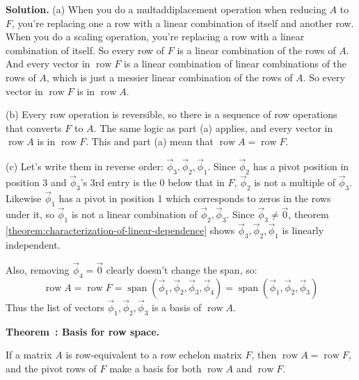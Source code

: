 \documentclass[11pt, letterpaper]{report}
\newenvironment{notes}{}{}
\newenvironment{book}{}{}
\newcounter{theorem}[chapter]
\newenvironment{theorem}[1][]{\refstepcounter{theorem}\begin{bbox}\par
    \noindent\textbf{Theorem~\thetheorem: #1}}{\end{bbox}}
\newlength\oldfboxsep%
\newlength\myminiwidth%
\newenvironment{bbox}{%
  \setlength\oldfboxsep\fboxsep
  \setlength{\fboxsep}{.1in}%
  \setlength\myminiwidth\linewidth%
  \addtolength\myminiwidth{-0.2in}%
  \vspace{0.1in}%
  \begin{lrbox}{\bboxbox}\begin{minipage}{\myminiwidth}%
    }{%
    \end{minipage}\end{lrbox}%
  \noindent\fbox{\usebox{\bboxbox}}\vspace{0.1in}\setlength\fboxsep\oldfboxsep%
}
\DeclareMathOperator{\row}{row}
\DeclareMathOperator{\spn}{span}
\begin{document}
\begin{notes}
\newpage 
\end{notes}

\begin{book}
\textbf{Solution.} (a) When you do a multaddiplacement operation when reducing $A$ to $F$, you're replacing one a row with a linear combination of itself and another row. When you do a scaling operation, you're replacing a row with a linear combination of itself. So every row of $F$ is a linear combination of the rows of $A$. And every vector in $\row F$ is a linear combination of linear combinations of the rows of $A$, which is just a messier linear combination of the rows of $A$. So every vector in $\row F$ is in $\row A$.

(b) Every row operation is reversible, so there is a sequence of row operations that converts $F$ to $A$. The same logic as part (a) applies, and every vector in $\row A$ is in $\row F$. This and part (a) mean that $\row A = \row F$.

(c) Let's write them in reverse order: $\vec{\phi}_3,\vec{\phi}_2,\vec{\phi}_1$. Since $\vec{\phi}_2$ has a pivot position in position 3 and $\vec{\phi}_3$'s 3rd entry is the $0$ below that in $F$, $\vec{\phi}_2$ is not a multiple of $\vec{\phi}_3$. Likewise $\vec{\phi}_1$ has a pivot in position 1 which corresponds to zeros in the rows under it, so $\vec{\phi}_1$ is not a linear combination of $\vec{\phi}_2,\vec{\phi}_3$. Since $\vec{\phi}_3\ne \vec{0}$, theorem \ref{theorem:characterization-of-linear-dependence} shows $\vec{\phi}_3,\vec{\phi}_2,\vec{\phi}_1$ is linearly independent.

Also, removing $\vec{\phi}_4=\vec{0}$ clearly doesn't change the span, so:
\[\row A = \row F = \spn ( \vec{\phi}_1,\vec{\phi}_2,\vec{\phi}_3,\vec{\phi}_4 ) =\spn ( \vec{\phi}_1,\vec{\phi}_2,\vec{\phi}_3 ) \]
Thus the list of vectors $\vec{\phi}_1,\vec{\phi}_2,\vec{\phi}_3$ is a basis of $\row A$. \hfill \blacksquare
\end{book}

\begin{notes}
\hspace{2pt}

\vspace{5in} \hspace{2pt}
\end{notes}

\begin{theorem}[Basis for row space.]  
\label{theorem:basis-for-row-space}

If a matrix $A$ is row-equivalent to a row echelon matrix $F$, then $\row A = \row F$, and the pivot rows of $F$ make a basis for both $\row A$ and $\row F$.
\end{theorem}
\end{document}
